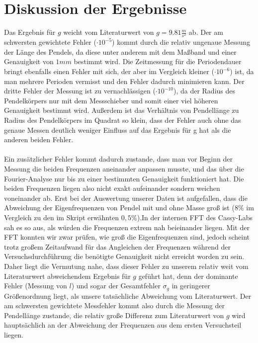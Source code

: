 \documentclass[a4paper, 11pt]{article}
\begin{document}
\section{Diskussion der Ergebnisse}
Das Ergebnis für $g$ weicht vom Literaturwert von $g = 9.81 \frac{m}{s^2}$ ab. Der am schwersten gewichtete Fehler ($\cdot10^{-5}$) kommt durch die relativ ungenaue Messung der Länge des Pendels, da diese unter anderem mit dem Maßband und einer Genauigkeit von $1mm$ bestimmt wird. Die Zeitmessung für die Periodendauer bringt ebenfalls einen Fehler mit sich, der aber im Vergleich kleiner ($\cdot10^{-6}$) ist, da man mehrere Perioden vermisst und den Fehler dadurch minimieren kann. Der dritte Fehler der Messung ist zu vernachlässigen ($\cdot10^{-10}$), da der Radius des Pendelkörpers nur mit dem Messschieber und somit einer viel höheren Genauigkeit bestimmt wird. Außerdem ist das Verhältnis von Pendellänge zu Radius des Pendelkörpers im Quadrat so klein, dass der Fehler auch ohne das genaue Messen deutlich weniger Einfluss auf das Ergebnis für g hat als die anderen beiden Fehler. \\
\\
Ein zusätzlicher Fehler kommt dadurch zustande, dass man vor Beginn der Messung die beiden Frequenzen aneinander anpassen musste, und das über die Fourier-Analyse nur bis zu einer bestimmten Genauigkeit funktioniert hat. Die beiden Frequenzen liegen also nicht exakt aufeinander sondern weichen voneinander ab. Erst bei der Auswertung unserer Daten ist aufgefallen, dass die Abweichung der Eigenfrequenzen von Pendel mit und ohne Masse groß ist ($8\%$ im Vergleich zu den im Skript erwähnten $0,5\%$).In der internen FFT des Cassy-Labs sah es so aus, als würden die Frequenzen extrem nah beieinander liegen. Mit der FFT konnten wir zwar prüfen, wie groß die Eigenfrequenzen sind, jedoch scheint trotz großem Zeitaufwand für das Angleichen der Frequenzen während der Versuchsdurchführung die benötigte Genauigkeit nicht erreicht worden zu sein. Daher liegt die Vermutung nahe, dass dieser Fehler zu unserem relativ weit vom Literaturwert abweichendem Ergebnis für $g$ geführt hat, denn der dominante Fehler (Messung von $l$) und sogar der Gesamtfehler $\sigma_g$ in geringerer Größenordnung liegt, als unsere tatsächliche Abweichung vom Literaturwert. Der am schwersten gewichtete Messfehler kommt also durch die Messung der Pendellänge zustande, die relativ große Differenz zum Literaturwert von $g$ wird hauptsächlich an der Abweichung der Frequenzen aus dem ersten Versuchsteil liegen.
\end{document}
